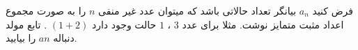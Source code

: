 \exercise
فرض کنید 
$a_n$
 بیانگر تعداد حالاتی باشد که میتوان عدد غیر منفی 
$n$
  را به صورت مجموع اعداد مثبت متمایز نوشت. مثلا برای عدد 
$3$
  ، 
$1$ 
 حالت وجود دارد
$(1 + 2)$
 . تابع مولد دنباله
$an$
  را بیابید.